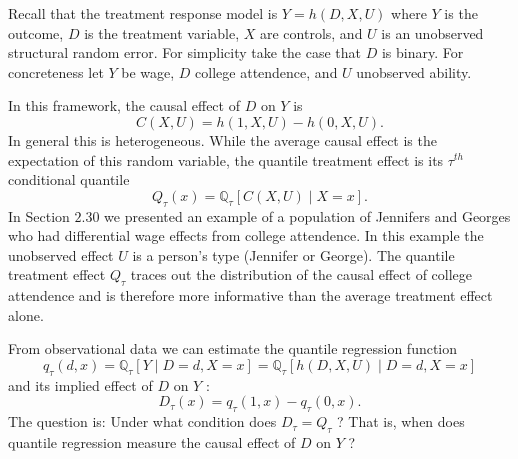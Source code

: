 \documentclass[10pt]{article}
\begin{document}
Recall that the treatment response model is $Y=h(D, X, U)$ where $Y$ is the outcome, $D$ is the treatment variable, $X$ are controls, and $U$ is an unobserved structural random error. For simplicity take the case that $D$ is binary. For concreteness let $Y$ be wage, $D$ college attendence, and $U$ unobserved ability.

In this framework, the causal effect of $D$ on $Y$ is
$$
C(X, U)=h(1, X, U)-h(0, X, U) .
$$
In general this is heterogeneous. While the average causal effect is the expectation of this random variable, the quantile treatment effect is its $\tau^{t h}$ conditional quantile
$$
Q_{\tau}(x)=\mathbb{Q}_{\tau}[C(X, U) \mid X=x] .
$$
In Section $2.30$ we presented an example of a population of Jennifers and Georges who had differential wage effects from college attendence. In this example the unobserved effect $U$ is a person's type (Jennifer or George). The quantile treatment effect $Q_{\tau}$ traces out the distribution of the causal effect of college attendence and is therefore more informative than the average treatment effect alone.

From observational data we can estimate the quantile regression function
$$
q_{\tau}(d, x)=\mathbb{Q}_{\tau}[Y \mid D=d, X=x]=\mathbb{Q}_{\tau}[h(D, X, U) \mid D=d, X=x]
$$
and its implied effect of $D$ on $Y$ :
$$
D_{\tau}(x)=q_{\tau}(1, x)-q_{\tau}(0, x) .
$$
The question is: Under what condition does $D_{\tau}=Q_{\tau}$ ? That is, when does quantile regression measure the causal effect of $D$ on $Y$ ?
\end{document}
